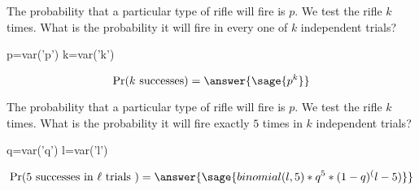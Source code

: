 \documentclass{ximera}
\begin{document}
\hspace{1cm}

\begin{problem}
The probability that a particular type of rifle will fire is $p$. We test the rifle $k$ times.
What is the probability it will fire in every one of $k$ independent trials? 

\begin{explanation}
\begin{sagesilent}
p=var('p')
k=var('k')
\end{sagesilent}
\begin{equation*} 
\Pr(k \text{ successes} ) = \answer{\sage{p^k}}
\end{equation*}

\end{explanation}
\end{problem}

\begin{problem}
The probability that a particular type of rifle will fire is $p$. We test the rifle $k$ times.
What is the probability it will fire exactly $5$ times in $k$ independent trials? 

\begin{explanation}
\begin{sagesilent}
q=var('q')
l=var('l')
\end{sagesilent}
\begin{equation*} 
\Pr(5 \text{ successes in  } \ell \text{ trials } ) = \answer{\sage{binomial(l,5)*q^5*(1-q)^(l-5)}} 
\end{equation*}
\end{explanation}
\end{problem}
\end{document}
